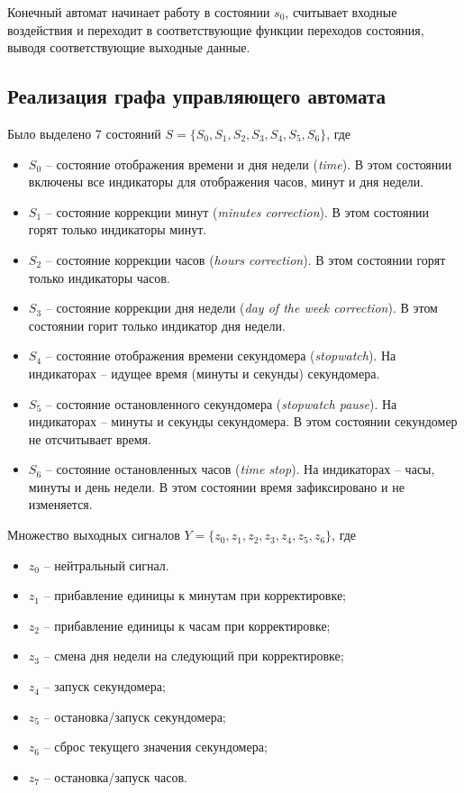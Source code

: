 \documentclass[a4paper, final]{article}
\begin{document}
Конечный автомат начинает работу в состоянии $s_0$, считывает входные воздействия и переходит в соответствующие функции переходов состояния, выводя соответствующие выходные данные.

\subsection{Реализация графа управляющего автомата}
Было выделено 7 состояний $S = \{S_0, S_1, S_2, S_3, S_4, S_5, S_6\}$, где
\begin{itemize}
  \item $S_0$ -- состояние отображения времени и дня недели (\textit{time}). В этом состоянии включены все индикаторы для отображения часов, минут и дня недели.
  \item $S_1$ -- состояние коррекции минут (\textit{minutes correction}). В этом состоянии горят только индикаторы минут.
  \item $S_2$ -- состояние коррекции часов (\textit{hours correction}). В этом состоянии горят только индикаторы часов.
  \item $S_3$ -- состояние коррекции дня недели (\textit{day of the week correction}). В этом состоянии горит только индикатор дня недели.
  \item $S_4$ -- состояние отображения времени секундомера (\textit{stopwatch}). На индикаторах -- идущее время (минуты и секунды) секундомера.
  \item $S_5$ -- состояние остановленного секундомера (\textit{stopwatch pause}). На индикаторах -- минуты и секунды секундомера. В этом состоянии секундомер не отсчитывает время.
  \item $S_6$ -- состояние остановленных часов (\textit{time stop}). На индикаторах -- часы, минуты и день недели. В этом состоянии время зафиксировано и не изменяется.
\end{itemize}

Множество выходных сигналов $Y = \{z_0, z_1, z_2, z_3, z_4, z_5, z_6\}$, где
\begin{itemize}
  \item $z_0$ -- нейтральный сигнал.
  \item $z_1$ -- прибавление единицы к минутам при корректировке;
  \item $z_2$ -- прибавление единицы к часам при корректировке;
  \item $z_3$ -- смена дня недели на следующий при корректировке;
  \item $z_4$ -- запуск секундомера;
  \item $z_5$ -- остановка/запуск секундомера;
  \item $z_6$ -- сброс текущего значения секундомера;
  \item $z_7$ -- остановка/запуск часов.
\end{itemize}
\end{document}
